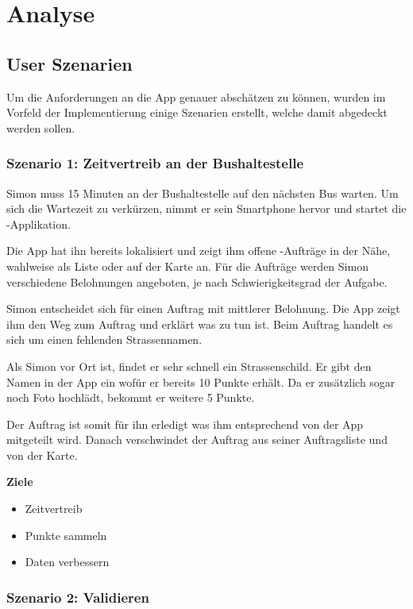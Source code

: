 \section{Analyse}

\subsection{User Szenarien}
\label{kort-user-szenarien}

Um die Anforderungen an die App genauer abschätzen zu können, wurden im Vorfeld der Implementierung einige Szenarien erstellt, welche damit abgedeckt werden sollen.

\subsubsection{Szenario 1: Zeitvertreib an der Bushaltestelle}

Simon muss 15 Minuten an der Bushaltestelle auf den nächsten Bus warten.
Um sich die Wartezeit zu verkürzen, nimmt er sein Smartphone hervor und startet die \kort{}-Applikation.

Die App hat ihn bereits lokalisiert und zeigt ihm offene -Aufträge in der Nähe, wahlweise als Liste oder auf der Karte an.
Für die Aufträge werden Simon verschiedene Belohnungen angeboten, je nach Schwierigkeitsgrad der Aufgabe.

Simon entscheidet sich für einen Auftrag mit mittlerer Belohnung.
Die App zeigt ihm den Weg zum Auftrag und erklärt was zu tun ist.
Beim Auftrag handelt es sich um einen fehlenden Strassennamen.

Als Simon vor Ort ist, findet er sehr schnell ein Strassenschild.
Er gibt den Namen in der App ein wofür er bereits 10 Punkte erhält.
Da er zusätzlich sogar noch Foto hochlädt, bekommt er weitere 5 Punkte.

Der Auftrag ist somit für ihn erledigt was ihm entsprechend von der App mitgeteilt wird.
Danach verschwindet der Auftrag aus seiner Auftragsliste und von der Karte.

\textbf{Ziele}
\begin{itemize}
\item Zeitvertreib
\item Punkte sammeln
\item Daten verbessern
\end{itemize}

\subsubsection{Szenario 2: Validieren}

